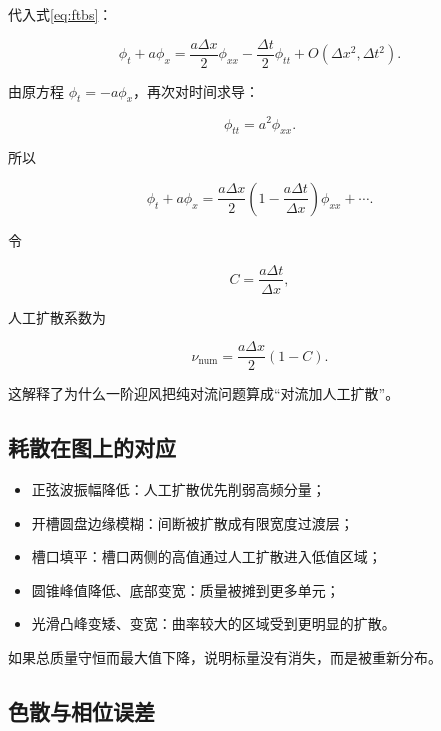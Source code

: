 \documentclass[UTF8,12pt,a4paper,fontset=fandol]{ctexart}
\numberwithin{equation}{section}
\begin{document}
代入式\eqref{eq:ftbs}：

\begin{equation}
  \phi_t+a\phi_x
  =
  \frac{a\Delta x}{2}\phi_{xx}
  -
  \frac{\Delta t}{2}\phi_{tt}
  +O(\Delta x^2,\Delta t^2).
\end{equation}

由原方程 $\phi_t=-a\phi_x$，再次对时间求导：

\begin{equation}
  \phi_{tt}=a^2\phi_{xx}.
\end{equation}

所以

\begin{equation}
  \boxed{
  \phi_t+a\phi_x
  =
  \frac{a\Delta x}{2}
  \left(1-\frac{a\Delta t}{\Delta x}\right)
  \phi_{xx}
  +\cdots
  }.
\end{equation}

令

\begin{equation}
  C=\frac{a\Delta t}{\Delta x},
\end{equation}

人工扩散系数为

\begin{equation}
  \nu_{\mathrm{num}}
  =
  \frac{a\Delta x}{2}(1-C).
  \label{eq:numerical_diffusion}
\end{equation}

这解释了为什么一阶迎风把纯对流问题算成“对流加人工扩散”。

\subsection{耗散在图上的对应}

\begin{itemize}
  \item 正弦波振幅降低：人工扩散优先削弱高频分量；
  \item 开槽圆盘边缘模糊：间断被扩散成有限宽度过渡层；
  \item 槽口填平：槽口两侧的高值通过人工扩散进入低值区域；
  \item 圆锥峰值降低、底部变宽：质量被摊到更多单元；
  \item 光滑凸峰变矮、变宽：曲率较大的区域受到更明显的扩散。
\end{itemize}

如果总质量守恒而最大值下降，说明标量没有消失，而是被重新分布。

\subsection{色散与相位误差}
\end{document}

